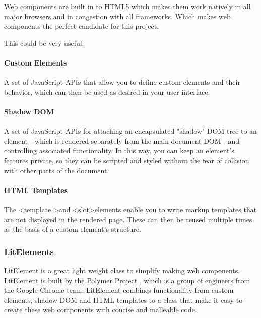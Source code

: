 Web components are built in to HTML5 which makes them work natively in all major browsers and in congestion with all frameworks. Which makes web components the perfect candidate for this project. 

This \cite{WebComponentsMDN} could be very useful.

\paragraph{Custom Elements}
\label{ssub:Custom Elements}

A set of JavaScript APIs that allow you to define custom elements and their behavior, which can then be used as desired in your user interface.


\paragraph{Shadow DOM}%
\label{ssub:Shadow DOM}
A set of JavaScript APIs for attaching an encapsulated "shadow" DOM tree to an element - which is rendered separately from the main document DOM - and controlling associated functionality. In this way, you can keep an element's features private, so they can be scripted and styled without the fear of collision with other parts of the document.

\paragraph{HTML Templates}%
\label{ssub:HMTL Templates}
The \textless template \textgreater and \textless slot\textgreater elements enable you to write markup templates that are not displayed in the rendered page. These can then be reused multiple times as the basis of a custom element's structure.

\subsubsection{LitElements}%
\label{ssub:LitElements}
LitElement is a great light weight class to simplify making web components\cite{polymerLitElement}. LitElement is built by the Polymer Project \cite{polymerPolymerProject}, which is a group of engineers from the Google Chrome team. LitElement combines functionality from custom elements, shadow DOM and HTML templates to a class that make it easy to create these web components with concise and malleable code.





